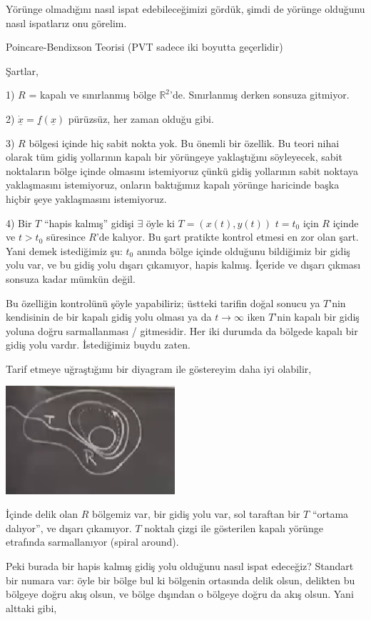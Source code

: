 \documentclass[12pt,fleqn]{article}\usepackage{../../common}
\begin{document}
Yörünge olmadığını nasıl ispat edebileceğimizi gördük, şimdi de yörünge olduğunu
nasıl ispatlarız onu görelim.

Poincare-Bendixson Teorisi (PVT sadece iki boyutta geçerlidir)

Şartlar,

1) $R$ = kapalı ve sınırlanmış bölge $\mathbb{R}^2$'de. Sınırlanmış derken
sonsuza gitmiyor.

2) $\dot{\underline{x}} = \underline{f}(\underline{x})$ pürüzsüz, her zaman olduğu
gibi. 

3) $R$ bölgesi içinde hiç sabit nokta yok. Bu önemli bir özellik. Bu teori nihai
olarak tüm gidiş yollarının kapalı bir yörüngeye yaklaştığını söyleyecek, sabit 
noktaların bölge içinde olmasını istemiyoruz çünkü gidiş yollarının sabit
noktaya yaklaşmasını istemiyoruz, onların baktığımız kapalı yörünge haricinde
başka hiçbir şeye yaklaşmasını istemiyoruz.

4) Bir $T$ ``hapis kalmış'' gidişi $\exists$ öyle ki $T=(x(t),y(t))$ $t=t_0$
için $R$ içinde ve $t>t_0$ süresince $R$'de kalıyor.  Bu şart pratikte kontrol
etmesi en zor olan şart. Yani demek istediğimiz şu: $t_0$ anında bölge içinde
olduğunu bildiğimiz bir gidiş yolu var, ve bu gidiş yolu dışarı çıkamıyor, hapis
kalmış. İçeride ve dışarı çıkması sonsuza kadar mümkün değil. 

Bu özelliğin kontrolünü şöyle yapabiliriz; üstteki tarifin doğal sonucu ya
$T$'nin kendisinin de bir kapalı gidiş yolu olması ya da $t \to \infty$ iken
$T$'nin kapalı bir gidiş yoluna doğru sarmallanması / gitmesidir. Her iki
durumda da bölgede kapalı bir gidiş yolu vardır. İstediğimiz buydu zaten.

Tarif etmeye uğraştığımı bir diyagram ile göstereyim daha iyi olabilir,

\includegraphics[height=4cm]{09_07.png}

İçinde delik olan $R$ bölgemiz var, bir gidiş yolu var, sol taraftan bir $T$
``ortama dalıyor'', ve dışarı çıkamıyor. $T$ noktalı çizgi ile gösterilen kapalı
yörünge etrafında sarmallanıyor (spiral around). 

Peki burada bir hapis kalmış gidiş yolu olduğunu nasıl ispat edeceğiz? Standart
bir numara var: öyle bir bölge bul ki bölgenin ortasında delik olsun, delikten
bu bölgeye doğru akış olsun, ve bölge dışından o bölgeye doğru da akış
olsun. Yani alttaki gibi,
\end{document}
